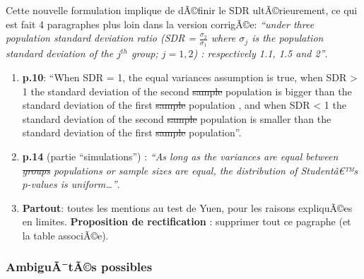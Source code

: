 \begin{appendix}
\color{black} Cette nouvelle formulation implique de dÃ©finir le SDR
ultÃ©rieurement, ce qui est fait 4 paragraphes plus loin dans la version
corrigÃ©e: \emph{``under three population standard deviation ratio (SDR
= \(\frac{\sigma_2}{\sigma_1}\) where \(\sigma_j\) is the population
standard deviation of the \(j^{th}\) group; \(j=1,2\)) : respectively
1.1, 1.5 and 2''}.

\begin{enumerate}
\def\labelenumi{\arabic{enumi})}
\setcounter{enumi}{1}
\item
  \color{black}\textbf{p.10}: ``When SDR = 1, the equal variances
  assumption is true, when SDR \textgreater{} 1 the standard deviation
  of the second \sout{sample} \color{blue} population \color{black} is
  bigger than the standard deviation of the first \sout{sample}
  \color{blue} population \color{black}, and when SDR \textless{} 1 the
  standard deviation of the second \sout{sample} \color{blue}population
  \color{black} is smaller than the standard deviation of the first
  \sout{sample} \color{blue} population''. \color{black}
\item
  \textbf{p.14} (partie ``simulations'') : \emph{``As long as the
  variances are equal between \sout{groups} \color{blue} populations
  \color{black} or sample sizes are equal, the distribution of
  Studentâ€™s \(p\)-values is uniform\ldots{}''}.
\item
  \textbf{Partout}: toutes les mentions au test de Yuen, pour les
  raisons expliquÃ©es en limites. \color{blue} \textbf{Proposition de
  rectification} : supprimer tout ce pagraphe (et la table associÃ©e).
  \color{black}
\end{enumerate}

\hypertarget{ambiguuxe3tuxe3s-possibles}{%
\subsubsection{AmbiguÃ¯tÃ©s
possibles}\label{ambiguuxe3tuxe3s-possibles}}


\end{appendix}
